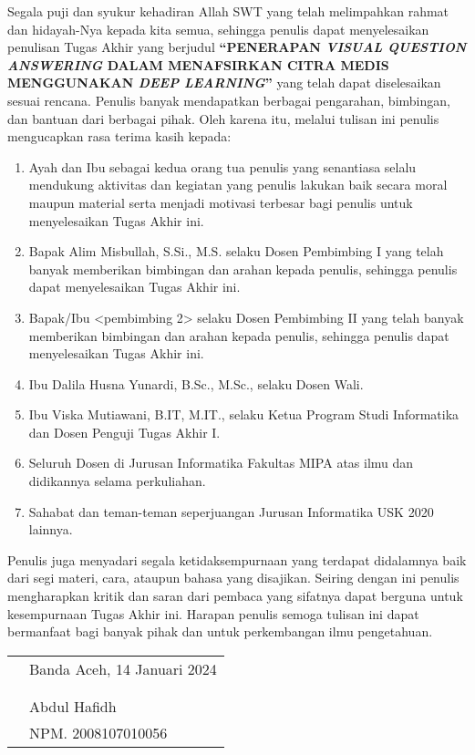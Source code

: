 \preface %


Segala puji dan syukur kehadiran Allah SWT yang telah melimpahkan rahmat dan hidayah-Nya kepada kita semua, sehingga penulis dapat menyelesaikan penulisan Tugas Akhir yang berjudul \textbf{“PENERAPAN \textit{VISUAL QUESTION ANSWERING} DALAM MENAFSIRKAN CITRA MEDIS MENGGUNAKAN \textit{DEEP LEARNING}”} yang telah dapat diselesaikan sesuai rencana. Penulis banyak mendapatkan berbagai pengarahan, bimbingan, dan bantuan dari berbagai pihak. Oleh karena itu, melalui tulisan ini penulis mengucapkan rasa terima kasih kepada:

\begin{enumerate}
	\item{Ayah dan Ibu sebagai kedua orang tua penulis yang senantiasa selalu mendukung aktivitas dan kegiatan yang penulis lakukan baik secara moral maupun material serta menjadi motivasi terbesar bagi penulis untuk menyelesaikan Tugas Akhir ini.}
	\item{Bapak Alim Misbullah, S.Si., M.S. selaku Dosen Pembimbing I yang telah banyak memberikan bimbingan dan arahan kepada penulis, sehingga penulis dapat menyelesaikan Tugas Akhir ini.}
	\item{Bapak/Ibu <pembimbing 2> selaku Dosen Pembimbing II yang telah banyak memberikan bimbingan dan arahan kepada penulis, sehingga penulis dapat menyelesaikan Tugas Akhir ini.}
	\item{Ibu Dalila Husna Yunardi, B.Sc., M.Sc., selaku Dosen Wali.}
	\item {Ibu Viska Mutiawani, B.IT, M.IT., selaku Ketua Program Studi Informatika dan Dosen Penguji Tugas Akhir I.}
	\item{Seluruh Dosen di Jurusan Informatika Fakultas MIPA atas ilmu dan didikannya selama perkuliahan.}
	\item{Sahabat dan teman-teman seperjuangan Jurusan Informatika USK 2020 lainnya.}
\end{enumerate}


Penulis juga menyadari segala ketidaksempurnaan yang terdapat didalamnya baik dari segi materi, cara, ataupun bahasa yang disajikan. Seiring dengan ini penulis mengharapkan kritik dan saran dari pembaca yang sifatnya dapat berguna untuk kesempurnaan Tugas Akhir ini. Harapan penulis semoga tulisan ini dapat bermanfaat bagi banyak pihak dan untuk perkembangan ilmu pengetahuan.

\vspace{1cm}


\begin{tabular}{p{7.5cm}l}
	&Banda Aceh, 14 Januari 2024\\
	&\\
	&\\
	&Abdul Hafidh\\
	&NPM. 2008107010056
\end{tabular}

